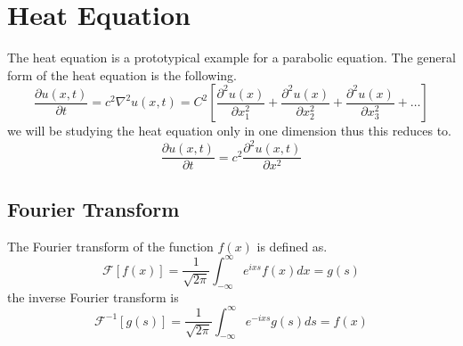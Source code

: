 \documentclass[]{article}
\begin{document}
\newpage

\section{Heat Equation}
The heat equation is a prototypical example for a parabolic equation. The general form of the heat equation is the following.
\[
    \frac{\partial u(x,t)}{\partial t} = c^2\nabla^2 u(x,t) = C^2\left[\frac{\partial^2 u(x)}{\partial x^{2}_{1}} + \frac{\partial^2 u(x)}{\partial x^{2}_{2}} + \frac{\partial^2 u(x)}{\partial x^{2}_{3}} + \dots\right]    
\]
we will be studying the heat equation only in one dimension thus this reduces to.
\[
    \frac{\partial u(x,t)}{\partial t} = c^2 \frac{\partial^2 u(x,t)}{\partial x^2}     
\]


\subsection{Fourier Transform}

The Fourier transform of the function $f(x)$ is defined as.
\[
    \mathscr{F}\left[f\left(x\right)\right]=\frac{1}{\sqrt{2\pi}}\int_{-\infty}^{\infty}e^{ixs}f\left(x\right)dx= g\left(s\right)    
\] 
the inverse Fourier transform is 
\[
    \mathscr{F}^{-1}\left[g\left(s\right)\right]=\frac{1}{\sqrt{2\pi}}\int_{-\infty}^{\infty}e^{-ixs}g\left(s\right)ds= f\left(x\right)    
\]
\setcounter{equation}{0}
\end{document}
